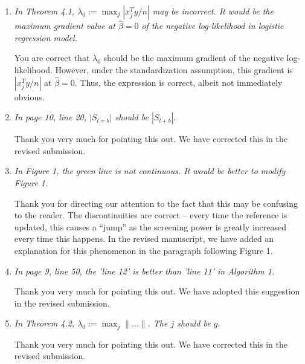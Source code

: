 \documentclass{article}
\begin{document}
\begin{enumerate}

\item \emph{In Theorem 4.1, $\lambda_0 := \max_j |x^T_j y/n|$ may be incorrect. It would be the maximum gradient value at $\hat{\beta} = 0$ of the negative log-likelihood in logistic regression model.}

  You are correct that $\lambda_0$ should be the maximum gradient of the negative log-likelihood. However, under the standardization assumption, this gradient is $|x^T_j y/n|$ at $\hat{\beta} = 0$. Thus, the expression is correct, albeit not immediately obvious.

\item \emph{In page 10, line 20, $|S_{l=b}|$ should be $|S_{l+b}|$.}

  Thank you very much for pointing this out. We have corrected this in the revised submission.

\item \emph{In Figure 1, the green line is not continuous. It would be better to modify Figure 1.}

  Thank you for directing our attention to the fact that this may be confusing to the reader. The discontinuities are correct -- every time the reference is updated, this causes a ``jump'' as the screening power is greatly increased every time this happens. In the revised manuscript, we have added an explanation for this phenomenon in the paragraph following Figure 1.

\item \emph{In page 9, line 50, the ’line 12’ is better than ’line 11’ in Algorithm 1.}

  Thank you very much for pointing this out. We have adopted this suggestion in the revised submission.

\item \emph{In Theorem 4.2, $\lambda_0 := \max_j \lVert \ldots \rVert$. The $j$ should be $g$.}

  Thank you very much for pointing this out. We have corrected this in the revised submission.

\end{enumerate}
\end{document}
